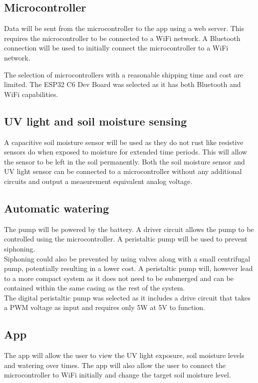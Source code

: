 \subsection{Microcontroller}
Data will be sent from the microcontroller to the app using a web server. This requires the microcontroller to be connected to a WiFi network. A Bluetooth connection will be used to initially connect the microcontroller to a WiFi network.

The selection of microcontrollers with a reasonable shipping time and cost are limited. The ESP32 C6 Dev Board was selected as it has both Bluetooth and WiFi capabilities.


\subsection{UV light and soil moisture sensing}
A capacitive soil moisture sensor will be used as they do not rust like resistive sensors do when exposed to moisture for extended time periods. This will allow the sensor to be left in the soil permanently. Both the soil moisture sensor and UV light sensor can be connected to a microcontroller without any additional circuits and output a measurement equivalent analog voltage. 

\subsection{Automatic watering}
The pump will be powered by the battery. A driver circuit allows the pump to be controlled using the microcontroller. A peristaltic pump will be used to prevent siphoning. \\

Siphoning could also be prevented by using valves along with a small centrifugal pump, potentially resulting in a lower cost. A peristaltic pump will, however lead to a more compact system as it does not need to be submerged and can be contained within the same casing as the rest of the system. \\

The digital peristaltic pump was selected as it includes a drive circuit that takes a PWM voltage as input and requires only 5W at 5V to function.

\subsection{App}
The app will allow the user to view the UV light exposure, soil moisture levels and watering over times. The app will also allow the user to connect the microcontroller to WiFi initially and change the target soil moisture level. 

